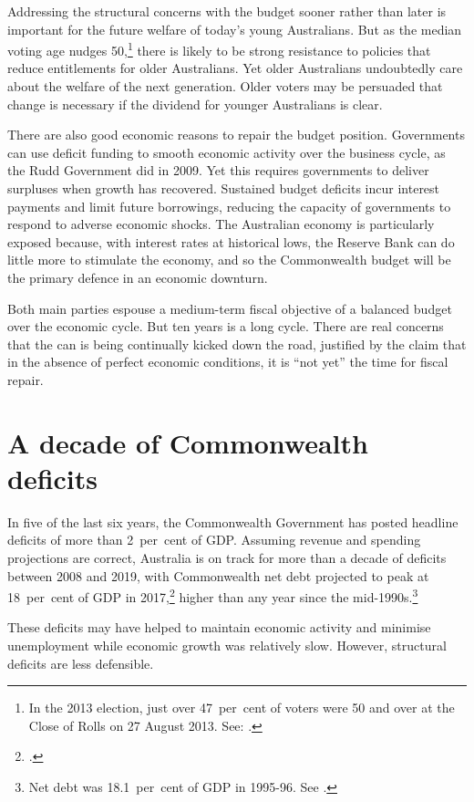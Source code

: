 \documentclass[twoside,english]{palatinob5ona4portrait}
\begin{document}
Addressing the structural concerns with the budget sooner rather than later is important for the future welfare of today’s young Australians. But as the median voting age nudges 50,\footnote{In the 2013 election, just over 47~per~cent of voters were 50 and over at the Close of Rolls on 27 August 2013. See: \textcite{AEC2013}.}  there is likely to be strong resistance to policies that reduce entitlements for older Australians. Yet older Australians undoubtedly care about the welfare of the next generation. Older voters may be persuaded that change is necessary if the dividend for younger Australians is clear. 

There are also good economic reasons to repair the budget position. Governments can use deficit funding to smooth economic activity over the business cycle, as the Rudd Government did in 2009. Yet this requires governments to deliver surpluses when growth has recovered. Sustained budget deficits incur interest payments and limit future borrowings, reducing the capacity of governments to respond to adverse economic shocks. The Australian economy is particularly exposed because, with interest rates at historical lows, the Reserve Bank can do little more to stimulate the economy, and so the Commonwealth budget will be the primary defence in an economic downturn. 

Both main parties espouse a medium-term fiscal objective of a balanced budget over the economic cycle. But ten years is a long cycle. There are real concerns that the can is being continually kicked down the road, justified by the claim that in the absence of perfect economic conditions, it is “not yet” the time for fiscal repair.
\cleardoubleevenstandardpage
\@openrighttrue\makeatother
\chapter{A decade of Commonwealth deficits}\label{chapter:FISCAL-2}
In five of the last six years, the Commonwealth Government has posted headline deficits of more than 2~per~cent of GDP\@. Assuming revenue and spending projections are correct, Australia is on track for more than a decade of deficits between 2008 and 2019, with Commonwealth net debt projected to peak at 18~per~cent of GDP in 2017,\footcite[][3--9]{Treasury2015BudgetPapers201516}  higher than any year since the mid-1990s.\footnote{Net debt was 18.1~per~cent of GDP in 1995-96. See \textcite[][273]{Treasury2014-MYEFO-2014-15}.}

These deficits may have helped to maintain economic activity and minimise unemployment while economic growth was relatively slow. However, structural deficits are less defensible. 
\end{document}
